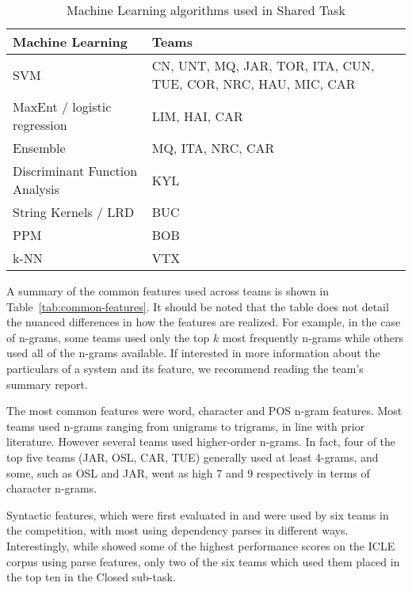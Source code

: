 \documentclass[11pt,letterpaper]{article}
\begin{document}
\begin{table*}[!ht]
\begin{center}
\begin{small}
\begin{tabular}{|l|p{10.5cm}|}
\hline
{\bf Machine Learning} & {\bf Teams} \\  \hline
SVM                    & CN, UNT, MQ, JAR, TOR, ITA, CUN, TUE, COR, NRC, HAU, MIC, CAR  \\ \hline
MaxEnt / logistic regression                 & LIM, HAI, CAR  \\ \hline
Ensemble               & MQ, ITA, NRC, CAR           \\ \hline
Discriminant Function Analysis & KYL \\ \hline
String Kernels / LRD   & BUC          \\ \hline
PPM                    & BOB \\ \hline
k-NN                   & VTX \\ \hline
\end{tabular}
\end{small}
\caption{Machine Learning algorithms used in Shared Task\label{tab:common-machine-learning}}
\end{center}
\end{table*}


A summary of the common features used across teams is shown in Table~\ref{tab:common-features}.  It should be noted that the table does not detail the nuanced differences in
how the features are realized.  For example, in the case of n-grams, some teams
used only the top $k$ most frequently n-grams while others used all of the n-grams
available.  If interested in more information about the particulars of a system
and its feature, we recommend reading the team's summary report.

The most common features were word, character and POS n-gram
features.  Most teams used n-grams ranging from unigrams to trigrams, in line with
prior literature.  However several teams used higher-order n-grams.  In fact, four
of the top five teams (JAR, OSL, CAR, TUE) generally used at least 4-grams, and some,
such as OSL and JAR, went as high 7 and 9 respectively in terms of character n-grams.

Syntactic features, which were first evaluated in  and  were used
by six teams in the competition, with most using dependency parses in different ways.
Interestingly, while  showed some of the
highest performance scores on the ICLE corpus using parse features, only two of the six
teams which used them placed in the top ten in the Closed sub-task.
\end{document}
